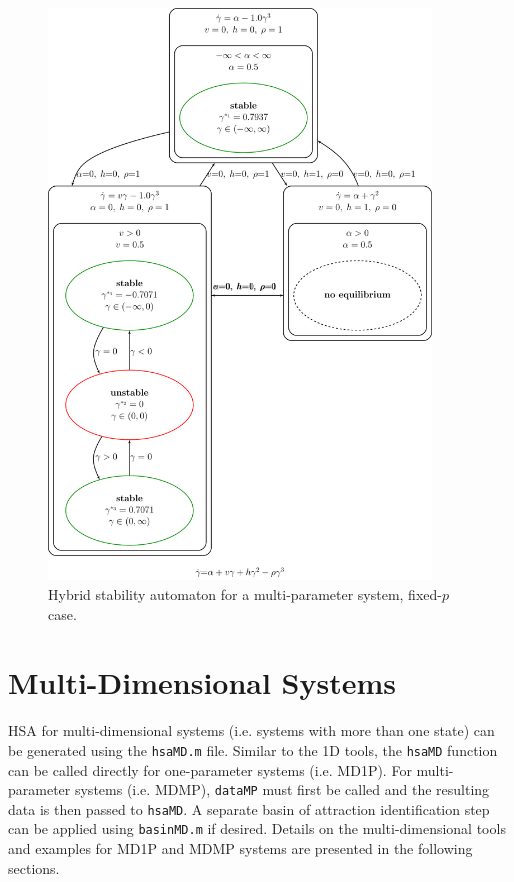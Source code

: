 \documentclass[12pt]{article}
\begin{document}
\begin{figure}[H]
\begin{center}
\includegraphics[width=4in]{ODMP_fpTexR.pdf}
\caption{Hybrid stability automaton for a multi-parameter system, fixed-$p$ case.}
\label{ODMP_fp}
\end{center}
\end{figure}


\section{Multi-Dimensional Systems}
HSA for multi-dimensional systems (i.e. systems with more than one state) can be generated using the \texttt{hsaMD.m} file. Similar to the 1D tools, the \texttt{hsaMD} function can be called directly for one-parameter systems (i.e. MD1P). For multi-parameter systems (i.e. MDMP), \texttt{dataMP} must first be called and the resulting data is then passed to \texttt{hsaMD}. A separate basin of attraction identification step can be applied using \texttt{basinMD.m} if desired. Details on the multi-dimensional tools and examples for MD1P and MDMP systems are presented in the following sections.
\end{document}
